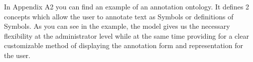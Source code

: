 In Appendix A2 you can find an example of an annotation ontology. It defines 2 concepts
which allow the user to annotate text as Symbols or definitions of Symbols. As you can see
in the example, the model gives us the necessary flexibility at the administrator level
while at the same time providing for a clear customizable method of displaying the
annotation form and representation for the user.

